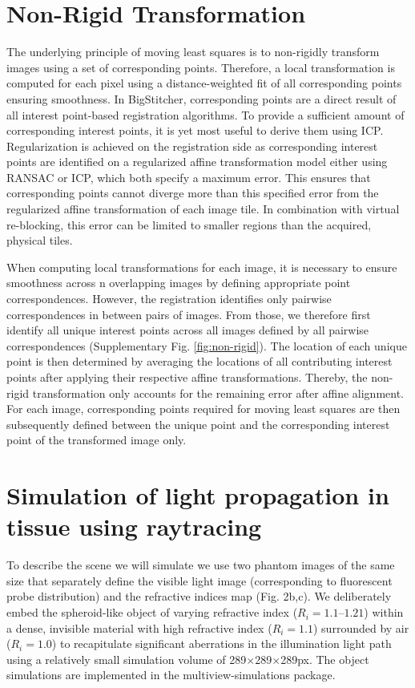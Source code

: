 \section{Non-Rigid Transformation}
\label{sec:nonrigid}

The underlying principle of moving least squares\cite{movingleastsquares} is to non-rigidly transform images using a set of corresponding points. Therefore, a local transformation is computed for each pixel using a distance-weighted fit of all corresponding points ensuring smoothness. In BigStitcher, corresponding points are a direct result of all interest point-based registration algorithms. To provide a sufficient amount of corresponding interest points, it is yet most useful to derive them using ICP\cite{icp}. Regularization is achieved on the registration side as corresponding interest points are identified on a regularized affine transformation model either using RANSAC\cite{ransac} or ICP\cite{icp}, which both specify a maximum error. This ensures that corresponding points cannot diverge more than this specified error from the regularized affine transformation of each image tile. In combination with virtual re-blocking, this error can be limited to smaller regions than the acquired, physical tiles. 

When computing local transformations for each image, it is necessary to ensure smoothness across n overlapping images by defining appropriate point correspondences. However, the registration identifies only pairwise correspondences in between pairs of images. From those, we therefore first identify all unique interest points across all images defined by all pairwise correspondences (Supplementary Fig. \ref{fig:non-rigid}). The location of each unique point is then determined by averaging the locations of all contributing interest points after applying their respective affine transformations. Thereby, the non-rigid transformation only accounts for the remaining error after affine alignment. For each image, corresponding points required for moving least squares are then subsequently defined between the unique point and the corresponding interest point of the transformed image only.

\section{Simulation of light propagation in tissue using raytracing}
\label{sec:raytracing}

To describe the scene we will simulate we use two phantom images of the same size that separately define the visible light image (corresponding to fluorescent probe distribution) and the refractive indices map (Fig. 2b,c). We deliberately embed the spheroid-like object of varying refractive index ($R_i=1.1 – 1.21$) within a dense, invisible material with high refractive index ($R_i=1.1$) surrounded by air ($R_i=1.0$) to recapitulate significant aberrations in the illumination light path using a relatively small simulation volume of 289$\times$289$\times$289px. The object simulations are implemented in the multiview-simulations package\cite{mvdecon}.

